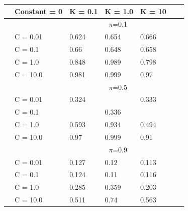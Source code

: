 \documentclass[english]{report}
\begin{document}
\begin{table}[H]
    \centering
    
    \begin{tabular}{ll|lllll}
        \hline
                                & \textbf{Constant = 0} &         K = 0.1 & K = 1.0 & K = 10 \\ \hline
                                & & \multicolumn{3}{c}{$\pi$=0.1} \\ \hline
                                & C = 0.01   & 0.624 & 0.654 & 0.666    \\
                                & C = 0.1    & 0.66 & 0.648 & 0.658  \\
                                & C = 1.0    & 0.848 & 0.989 & 0.798    \\
                                & C = 10.0   & 0.981 & 0.999 & 0.97  \\ \hline

                                & & \multicolumn{3}{c}{$\pi$=0.5} \\ \hline
                                & C = 0.01   & 0.324 & \color{red}{0.331} & 0.333   \\
                                & C = 0.1    & \color{red}{0.321} & 0.336 & \color{red}{0.317}  \\
                                & C = 1.0    & 0.593 & 0.934 & 0.494    \\
                                & C = 10.0   & 0.97 & 0.999 & 0.91  \\ \hline

                                & & \multicolumn{3}{c}{$\pi$=0.9} \\ \hline
                                & C = 0.01   & 0.127 & 0.12 & 0.113  \\
                                & C = 0.1    & 0.124 & 0.11 & 0.116  \\
                                & C = 1.0    & 0.285 & 0.359 & 0.203    \\
                                & C = 10.0   & 0.511 & 0.74 & 0.563  \\ 
    \hline
    \end{tabular}
\end{table}
\end{document}
